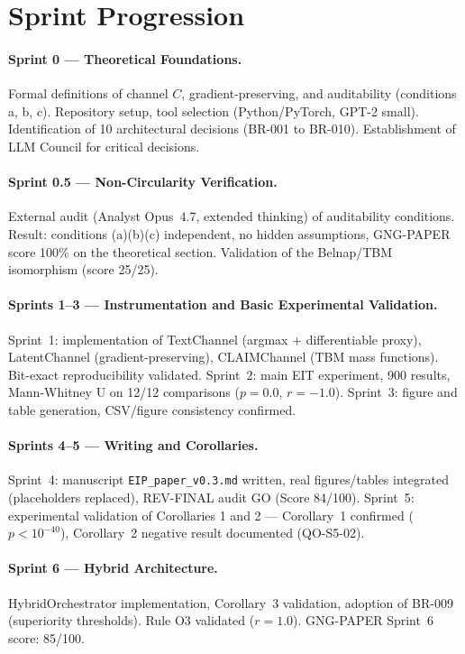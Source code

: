 \documentclass[11pt,a4paper]{article}
\theoremstyle{plain}
\begin{document}
\section{Sprint Progression}

\paragraph{Sprint 0 --- Theoretical Foundations.}
Formal definitions of channel $C$, gradient-preserving, and auditability (conditions
a, b, c). Repository setup, tool selection (Python/PyTorch, GPT-2 small).
Identification of 10 architectural decisions (BR-001 to BR-010). Establishment of
LLM Council for critical decisions.

\paragraph{Sprint 0.5 --- Non-Circularity Verification.}
External audit (Analyst Opus~4.7, extended thinking) of auditability conditions.
Result: conditions (a)(b)(c) independent, no hidden assumptions, GNG-PAPER score
100\% on the theoretical section. Validation of the Belnap/TBM isomorphism
(score 25/25).

\paragraph{Sprints 1--3 --- Instrumentation and Basic Experimental Validation.}
Sprint~1: implementation of TextChannel (argmax + differentiable proxy),
LatentChannel (gradient-preserving), CLAIMChannel (TBM mass functions). Bit-exact
reproducibility validated. Sprint~2: main EIT experiment, 900 results, Mann-Whitney
U on 12/12 comparisons ($p = 0.0$, $r = -1.0$). Sprint~3: figure and table
generation, CSV/figure consistency confirmed.

\paragraph{Sprints 4--5 --- Writing and Corollaries.}
Sprint~4: manuscript \texttt{EIP\_paper\_v0.3.md} written, real figures/tables
integrated (placeholders replaced), REV-FINAL audit GO (Score 84/100). Sprint~5:
experimental validation of Corollaries 1 and 2 --- Corollary~1 confirmed
($p < 10^{-40}$), Corollary~2 negative result documented (QO-S5-02).

\paragraph{Sprint 6 --- Hybrid Architecture.}
HybridOrchestrator implementation, Corollary~3 validation, adoption of BR-009
(superiority thresholds). Rule O3 validated ($r = 1.0$). GNG-PAPER Sprint~6
score: 85/100.
\end{document}
